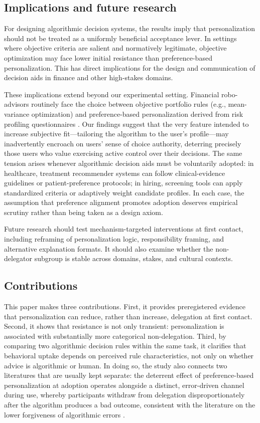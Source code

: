\documentclass[a4paper, 12pt, fleqn]{article}
\theoremstyle{definition}
\begin{document}
\subsection{Implications and future research}
For designing algorithmic decision systems, the results imply that personalization should not be treated as a uniformly beneficial acceptance lever. In settings where objective criteria are salient and normatively legitimate, objective optimization may face lower initial resistance than preference-based personalization. This has direct implications for the design and communication of decision aids in finance and other high-stakes domains.

These implications extend beyond our experimental setting. Financial robo-advisors routinely face the choice between objective portfolio rules (e.g., mean-variance optimization) and preference-based personalization derived from risk profiling questionnaires \citep{Capponi2022,Ruehr2020}. Our findings suggest that the very feature intended to increase subjective fit---tailoring the algorithm to the user's profile---may inadvertently encroach on users' sense of choice authority, deterring precisely those users who value exercising active control over their decisions. The same tension arises whenever algorithmic decision aids must be voluntarily adopted: in healthcare, treatment recommender systems can follow clinical-evidence guidelines or patient-preference protocols; in hiring, screening tools can apply standardized criteria or adaptively weight candidate profiles. In each case, the assumption that preference alignment promotes adoption deserves empirical scrutiny rather than being taken as a design axiom.

Future research should test mechanism-targeted interventions at first contact, including reframing of personalization logic, responsibility framing, and alternative explanation formats. It should also examine whether the non-delegator subgroup is stable across domains, stakes, and cultural contexts.

\subsection{Contributions}
This paper makes three contributions. First, it provides preregistered evidence that personalization can reduce, rather than increase, delegation at first contact. Second, it shows that resistance is not only transient: personalization is associated with substantially more categorical non-delegation. Third, by comparing two algorithmic decision rules within the same task, it clarifies that behavioral uptake depends on perceived rule characteristics, not only on whether advice is algorithmic or human. In doing so, the study also connects two literatures that are usually kept separate: the deterrent effect of preference-based personalization at adoption operates alongside a distinct, error-driven channel during use, whereby participants withdraw from delegation disproportionately after the algorithm produces a bad outcome, consistent with the literature on the lower forgiveness of algorithmic errors \citep{Dietvorst2018,Renier2021}.
\end{document}
